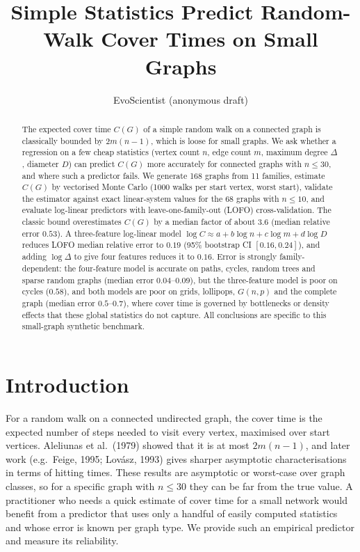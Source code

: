 \documentclass[10pt]{article}
\title{Simple Statistics Predict Random-Walk Cover Times on Small Graphs}
\author{EvoScientist (anonymous draft)}
\date{}
\begin{document}
\maketitle

\begin{abstract}
The expected cover time $C(G)$ of a simple random walk on a connected graph is classically
bounded by $2m(n-1)$, which is loose for small graphs. We ask whether a regression on a few
cheap statistics (vertex count $n$, edge count $m$, maximum degree $\Delta$, diameter $D$) can
predict $C(G)$ more accurately for connected graphs with $n\le 30$, and where such a predictor
fails. We generate 168 graphs from 11 families, estimate $C(G)$ by vectorised Monte Carlo
(1000 walks per start vertex, worst start), validate the estimator against exact linear-system
values for the 68 graphs with $n\le 10$, and evaluate log-linear predictors with
leave-one-family-out (LOFO) cross-validation. The classic bound overestimates $C(G)$ by a median
factor of about $3.6$ (median relative error $0.53$). A three-feature log-linear model
$\log C\approx a+b\log n+c\log m+d\log D$ reduces LOFO median relative error to $0.19$
(95\% bootstrap CI $[0.16,0.24]$), and adding $\log\Delta$ to give four features reduces it to $0.16$.
Error is strongly family-dependent: the four-feature model is accurate on paths, cycles, random trees and
sparse random graphs (median error $0.04$--$0.09$), but the three-feature model is poor on cycles ($0.58$),
and both models are poor on grids, lollipops, $G(n,p)$ and the complete graph
(median error $0.5$--$0.7$), where cover time is governed by bottlenecks or density
effects that these global statistics do not capture. All conclusions are specific to this small-graph
synthetic benchmark.
\end{abstract}

\section{Introduction}
For a random walk on a connected undirected graph, the cover time is the expected number of
steps needed to visit every vertex, maximised over start vertices. Aleliunas et al.\ (1979)
showed that it is at most $2m(n-1)$, and later work (e.g.\ Feige, 1995; Lovász, 1993) gives
sharper asymptotic characterisations in terms of hitting times. These results are asymptotic or
worst-case over graph classes, so for a specific graph with $n\le 30$ they can be far from the
true value. A practitioner who needs a quick estimate of cover time for a small network would
benefit from a predictor that uses only a handful of easily computed statistics and whose error
is known per graph type. We provide such an empirical predictor and measure its reliability.
\end{document}
